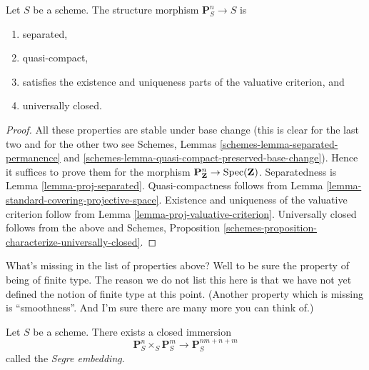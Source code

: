 \begin{lemma}
\label{lemma-projective-space-separated}
Let $S$ be a scheme.
The structure morphism $\mathbf{P}^n_S \to S$ is
\begin{enumerate}
\item separated,
\item quasi-compact,
\item satisfies the existence and uniqueness parts of the valuative criterion,
and
\item universally closed.
\end{enumerate}
\end{lemma}

\begin{proof}
All these properties are stable under base change (this is clear for the
last two and for the other two see
Schemes, Lemmas
\ref{schemes-lemma-separated-permanence} and
\ref{schemes-lemma-quasi-compact-preserved-base-change}).
Hence it suffices to prove them for the morphism
$\mathbf{P}^n_{\mathbf{Z}} \to \mathop{\mathrm{Spec}}(\mathbf{Z})$.
Separatedness is Lemma \ref{lemma-proj-separated}. Quasi-compactness follows
from Lemma \ref{lemma-standard-covering-projective-space}.
Existence and uniqueness of the valuative criterion follow from
Lemma \ref{lemma-proj-valuative-criterion}.
Universally closed follows from the above and
Schemes, Proposition \ref{schemes-proposition-characterize-universally-closed}.
\end{proof}

\begin{remark}
\label{remark-missing-finite-type}
What's missing in the list of properties above? Well to be sure the property
of being of finite type. The reason we do not list this here is that we have
not yet defined the notion of finite type at this point. (Another property
which is missing is ``smoothness''. And I'm sure there are many more you can
think of.)
\end{remark}

\begin{lemma}
\label{lemma-segre-embedding}
Let $S$ be a scheme. There exists a closed immersion
$$
\mathbf{P}^n_S \times_S \mathbf{P}^m_S
\longrightarrow
\mathbf{P}^{nm + n + m}_S
$$
called the {\it Segre embedding}.
\end{lemma}

